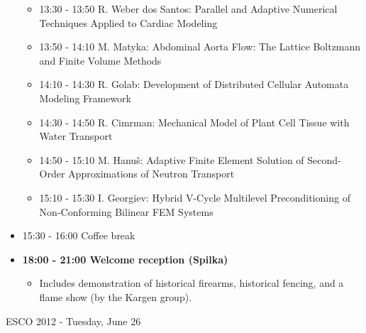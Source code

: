 \documentclass[10pt, A4]{article}%
\begin{document}
\begin{itemize}
\begin{itemize}
    \item 13:30 - 13:50 R. Weber dos Santos: Parallel and Adaptive Numerical Techniques Applied to Cardiac Modeling
    \item 13:50 - 14:10 M. Matyka: Abdominal Aorta Flow: The Lattice Boltzmann and Finite Volume Methods
    \item 14:10 - 14:30 R. Golab: Development of Distributed Cellular Automata Modeling Framework
    \item 14:30 - 14:50 R. Cimrman: Mechanical Model of Plant Cell Tissue with Water Transport
    \item 14:50 - 15:10 M. Hanu\v{s}: Adaptive Finite Element Solution of Second-Order Approximations of Neutron Transport
    \item 15:10 - 15:30 I. Georgiev: Hybrid V-Cycle Multilevel Preconditioning of Non-Conforming Bilinear FEM Systems
  \end{itemize}
  \item 15:30 - 16:00 Coffee break
  \item {\bf 18:00 - 21:00 Welcome reception (Spilka)} 
  \begin{itemize}
     \item Includes demonstration of historical firearms, historical fencing, and a flame show (by the Kargen group).
  \end{itemize}
\end{itemize}

\newpage

\centerline{\huge ESCO 2012 - Tuesday, June 26}
\vspace{4mm}
\end{document}
